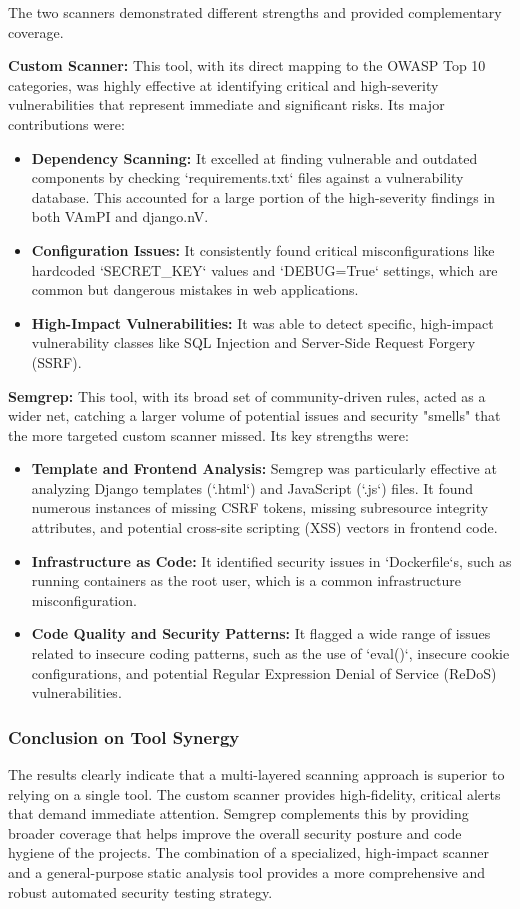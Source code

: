 The two scanners demonstrated different strengths and provided complementary coverage.

\textbf{Custom Scanner:} This tool, with its direct mapping to the OWASP Top 10 categories, was highly effective at identifying critical and high-severity vulnerabilities that represent immediate and significant risks. Its major contributions were:
\begin{itemize}
    \item \textbf{Dependency Scanning:} It excelled at finding vulnerable and outdated components by checking `requirements.txt` files against a vulnerability database. This accounted for a large portion of the high-severity findings in both VAmPI and django.nV.
    \item \textbf{Configuration Issues:} It consistently found critical misconfigurations like hardcoded `SECRET\_KEY` values and `DEBUG=True` settings, which are common but dangerous mistakes in web applications.
    \item \textbf{High-Impact Vulnerabilities:} It was able to detect specific, high-impact vulnerability classes like SQL Injection and Server-Side Request Forgery (SSRF).
\end{itemize}

\textbf{Semgrep:} This tool, with its broad set of community-driven rules, acted as a wider net, catching a larger volume of potential issues and security "smells" that the more targeted custom scanner missed. Its key strengths were:
\begin{itemize}
    \item \textbf{Template and Frontend Analysis:} Semgrep was particularly effective at analyzing Django templates (`.html`) and JavaScript (`.js`) files. It found numerous instances of missing CSRF tokens, missing subresource integrity attributes, and potential cross-site scripting (XSS) vectors in frontend code.
    \item \textbf{Infrastructure as Code:} It identified security issues in `Dockerfile`s, such as running containers as the root user, which is a common infrastructure misconfiguration.
    \item \textbf{Code Quality and Security Patterns:} It flagged a wide range of issues related to insecure coding patterns, such as the use of `eval()`, insecure cookie configurations, and potential Regular Expression Denial of Service (ReDoS) vulnerabilities.
\end{itemize}

\subsubsection*{Conclusion on Tool Synergy}
The results clearly indicate that a multi-layered scanning approach is superior to relying on a single tool. The custom scanner provides high-fidelity, critical alerts that demand immediate attention. Semgrep complements this by providing broader coverage that helps improve the overall security posture and code hygiene of the projects. The combination of a specialized, high-impact scanner and a general-purpose static analysis tool provides a more comprehensive and robust automated security testing strategy.
